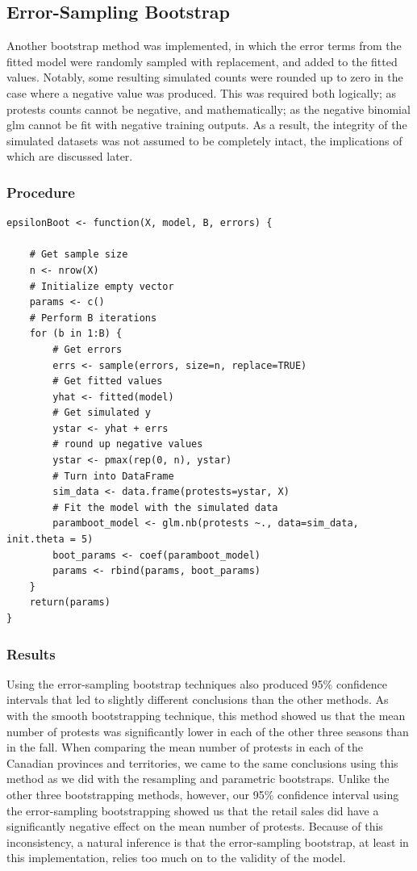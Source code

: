 \documentclass[12pt]{article}
\begin{document}


\subsection{Error-Sampling Bootstrap}
Another bootstrap method was implemented, in which the error terms from the fitted model were randomly sampled with replacement, and added to the fitted values. Notably, some resulting simulated counts were rounded up to zero in the case where a negative value was produced. This was required both logically; as protests counts cannot be negative, and mathematically; as the negative binomial glm cannot be fit with negative training outputs. As a result, the integrity of the simulated datasets was not assumed to be completely intact, the implications of which are discussed later.

\subsubsection*{Procedure}

\begin{lstlisting}
epsilonBoot <- function(X, model, B, errors) {

    # Get sample size
    n <- nrow(X)
    # Initialize empty vector
    params <- c()
    # Perform B iterations
    for (b in 1:B) {
        # Get errors
        errs <- sample(errors, size=n, replace=TRUE)
        # Get fitted values
        yhat <- fitted(model)
        # Get simulated y
        ystar <- yhat + errs
        # round up negative values
        ystar <- pmax(rep(0, n), ystar)
        # Turn into DataFrame
        sim_data <- data.frame(protests=ystar, X)
        # Fit the model with the simulated data
        paramboot_model <- glm.nb(protests ~., data=sim_data, init.theta = 5)
        boot_params <- coef(paramboot_model)
        params <- rbind(params, boot_params)
    }
    return(params)
}
\end{lstlisting}
\subsubsection*{Results}
Using the error-sampling bootstrap techniques also produced 95\% confidence intervals that led to slightly different conclusions than the other methods. As with the smooth bootstrapping technique, this method showed us that the mean number of protests was significantly lower in each of the other three seasons than in the fall.
When comparing the mean number of protests in each of the Canadian provinces and territories, we came to the same conclusions using this method as we did with the resampling and parametric bootstraps.
Unlike the other three bootstrapping methods, however, our 95\% confidence interval using the error-sampling bootstrapping showed us that the retail sales did have a significantly negative effect on the mean number of protests. Because of this inconsistency, a natural inference is that the error-sampling bootstrap, at least in this implementation, relies too much on to the validity of the model.
\end{document}
